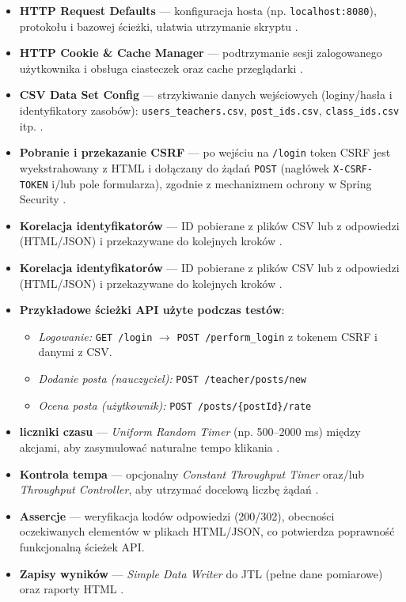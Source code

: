 \begin{itemize}
  \item \textbf{HTTP Request Defaults} ---  konfiguracja hosta (np. \texttt{localhost:8080}),
        protokołu i bazowej ścieżki, ułatwia utrzymanie skryptu \cite{jmeter-docs}.
  \item \textbf{HTTP Cookie \& Cache Manager} --- podtrzymanie sesji zalogowanego użytkownika i obsługa ciasteczek oraz cache przeglądarki \cite{jmeter-docs}.
  \item \textbf{CSV Data Set Config} --- strzykiwanie danych wejściowych (loginy/hasła i identyfikatory zasobów): \texttt{users\_teachers.csv}, \texttt{post\_ids.csv}, \texttt{class\_ids.csv} itp. \cite{jmeter-docs}.
  \item \textbf{Pobranie i przekazanie CSRF} --- po wejściu na \texttt{/login} token CSRF jest wyekstrahowany z HTML i dołączany do żądań \texttt{POST} (nagłówek \texttt{X-CSRF-TOKEN} i/lub pole formularza), zgodnie z mechanizmem ochrony w Spring Security \cite{spring-docs}.
  \item \textbf{Korelacja identyfikatorów} — ID pobierane z plików CSV lub z odpowiedzi (HTML/JSON) i przekazywane do kolejnych kroków \cite{jmeter-docs}.
  \item \textbf{Korelacja identyfikatorów} ---  ID pobierane z plików CSV lub z odpowiedzi (HTML/JSON) i przekazywane do kolejnych kroków \cite{jmeter-docs}.
  \item \textbf{Przykładowe ścieżki API użyte podczas testów}:
    \begin{itemize}
      \item \emph{Logowanie:} \texttt{GET /login} $\rightarrow$ \texttt{POST /perform\_login}
            z tokenem CSRF i danymi z CSV.
      \item \emph{Dodanie posta (nauczyciel):} \texttt{POST /teacher/posts/new}
      \item \emph{Ocena posta (użytkownik):} \texttt{POST /posts/\{postId\}/rate}
    \end{itemize}
  \item \textbf{liczniki czasu} --- \emph{Uniform Random Timer} (np. 500--2000 ms) między akcjami,
        aby zasymulować naturalne tempo klikania \cite{jmeter-docs}.
  \item \textbf{Kontrola tempa} --- opcjonalny \emph{Constant Throughput Timer} oraz/lub
        \emph{Throughput Controller}, aby utrzymać docelową liczbę żądań \cite{jmeter-docs}.
  \item \textbf{Assercje} --- weryfikacja kodów odpowiedzi (200/302), obecności oczekiwanych elementów w plikach HTML/JSON,
        co potwierdza poprawność funkcjonalną ścieżek API.
  \item \textbf{Zapisy wyników} --- \emph{Simple Data Writer} do JTL (pełne dane pomiarowe) oraz raporty HTML \cite{jmeter-docs}.
\end{itemize}

